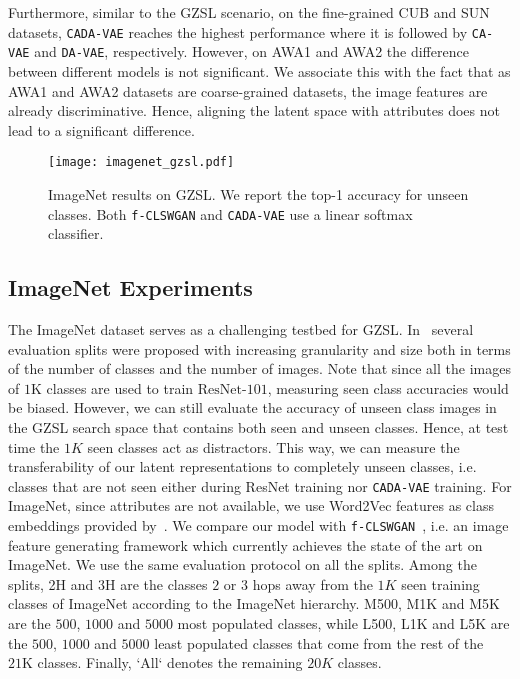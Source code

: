 \documentclass[10pt,twocolumn,letterpaper]{article}
\begin{document}
Furthermore, similar to the GZSL scenario, on the fine-grained CUB and SUN datasets, \texttt{CADA-VAE} reaches the highest performance where it is followed by \texttt{CA-VAE} and \texttt{DA-VAE}, respectively. However,
on AWA1 and AWA2 the difference between different models is not significant. We associate this with the fact that as AWA1 and AWA2 datasets are coarse-grained datasets, the image features are already discriminative. Hence, aligning the latent space with attributes does not lead to a significant difference.

\begin{figure}[t]
\centering
\texttt{[image: imagenet\_gzsl.pdf]}
\caption{ImageNet results on GZSL. We report the top-1 accuracy for unseen classes. Both \texttt{f-CLSWGAN} and \texttt{CADA-VAE} use a linear softmax classifier.}
\label{fig:imagenet_results}
\end{figure}

\subsection{ImageNet Experiments}

The ImageNet dataset serves as a challenging testbed for GZSL. In~\cite{goodbadugly} several evaluation splits were proposed with increasing granularity and size both in terms of the number of classes and the number of images. Note that since all the images of $1\mathrm{K}$ classes are used to train $\mathrm{ResNet}$-$\mathrm{101}$, measuring seen class accuracies would be biased. However, we can still evaluate the accuracy of unseen class images in the GZSL search space that contains both seen and unseen classes. Hence, at test time the $1K$ seen classes act as distractors. This way, we can measure the transferability of our latent representations to completely unseen classes, i.e. classes that are not seen either during ResNet training nor \texttt{CADA-VAE} training. For ImageNet, since attributes are not available, we use Word2Vec features as class embeddings provided by~\cite{sync}. 
We compare our model with \texttt{f-CLSWGAN}~\cite{featgen}, i.e. an image feature generating framework which currently achieves the state of the art on ImageNet. We use the same evaluation protocol on all the splits. Among the splits, 2H and 3H are the classes $2$ or $3$ hops away from the $1K$ seen training classes of ImageNet according to the ImageNet hierarchy. M500, M1K and M5K are the $500$, $1000$ and $5000$ most populated classes, while L500, L1K and L5K are the $500$, $1000$ and $5000$ least populated classes that come from the rest of the $21\mathrm{K}$ classes. Finally, `All` denotes the remaining $20K$ classes.
\end{document}
